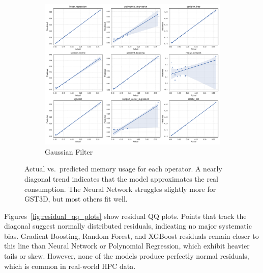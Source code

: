 \begin{figure}[htbp]
    \begin{subfigure}[t]{0.32\textwidth}
        \includegraphics[width=\textwidth]{assets/images/05/actual_vs_predicted_by_model_gaussian-filter}
        \caption{Gaussian Filter}
    \end{subfigure}
    \caption{Actual vs.\ predicted memory usage for each operator.
    A nearly diagonal trend indicates that the model approximates the real consumption.
    The Neural Network struggles slightly more for \ac{GST3D}, but most others fit well.}
    \label{fig:actual_vs_predicted}
\end{figure}

Figures~\ref{fig:residual_qq_plots} show residual \ac{QQ} plots.
Points that track the diagonal suggest normally distributed residuals, indicating no major systematic bias.
Gradient Boosting, Random Forest, and XGBoost residuals remain closer to this line than Neural Network or Polynomial Regression, which exhibit heavier tails or skew.
However, none of the models produce perfectly normal residuals, which is common in real-world \ac{HPC} data.

